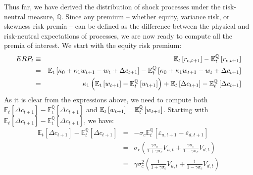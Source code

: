 \documentclass[11pt]{article}
\begin{document}
\begin{small}
Thus far, we have derived the distribution of shock processes under the
risk-neutral measure, $\mathbb{Q}$. Since any premium -- whether equity,
variance risk, or skewness risk premia -- can be defined as the difference
between the physical and risk-neutral expectations of processes, we are now
ready to compute all the premia of interest. We start with the equity risk
premium:%
\begin{eqnarray*}
ERP_{t} &\equiv &\mathbb{E}_{t}\left[ r_{c,t+1}\right] -\mathbb{E}_{t}^{%
\mathbb{Q}}\left[ r_{c,t+1}\right] \\
&=&\mathbb{E}_{t}\left[ \kappa _{0}+\kappa _{1}w_{t+1}-w_{t}+\Delta c_{t+1}%
\right] -\mathbb{E}_{t}^{\mathbb{Q}}\left[ \kappa _{0}+\kappa
_{1}w_{t+1}-w_{t}+\Delta c_{t+1}\right] \\
&=&\kappa _{1}\left( \mathbb{E}_{t}\left[ w_{t+1}\right] -\mathbb{E}_{t}^{%
\mathbb{Q}}\left[ w_{t+1}\right] \right) +\mathbb{E}_{t}\left[ \Delta c_{t+1}%
\right] -\mathbb{E}_{t}^{\mathbb{Q}}\left[ \Delta c_{t+1}\right]
\end{eqnarray*}%
As it is clear from the expressions above, we need to compute both $\mathbb{E%
}_{t}\left[ \Delta c_{t+1}\right] -\mathbb{E}_{t}^{\mathbb{Q}}\left[ \Delta
c_{t+1}\right]$ and $\mathbb{E}_{t}\left[ w_{t+1}\right] -\mathbb{E}_{t}^{%
\mathbb{Q}}\left[ w_{t+1}\right]$. Starting with $\mathbb{E}_{t}\left[
\Delta c_{t+1}\right] -\mathbb{E}_{t}^{\mathbb{Q}}\left[ \Delta c_{t+1}%
\right]$, we have:
\begin{eqnarray*}
\mathbb{E}_{t}\left[ \Delta c_{t+1}\right] -\mathbb{E}_{t}^{\mathbb{Q}}\left[
\Delta c_{t+1}\right] &=&-\sigma _{c}\mathbb{E}_{t}^{\mathbb{Q}}\left[
\varepsilon _{u,t+1}-\varepsilon _{d,t+1}\right] \\
&=&\sigma _{c}\left( \frac{\gamma \sigma _{c}}{1+\gamma \sigma _{c}}V_{u,t}+%
\frac{\gamma \sigma _{c}}{1-\gamma \sigma _{c}}V_{d,t}\right) \\
&=&\gamma \sigma _{c}^{2}\left( \frac{1}{1+\gamma \sigma _{c}}V_{u,t}+\frac{1%
}{1-\gamma \sigma _{c}}V_{d,t}\right)
\end{eqnarray*}


\end{small}
\end{document}
